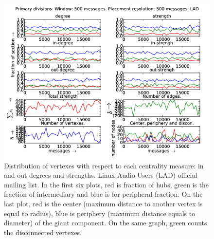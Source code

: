 \documentclass[%
 aip,
 jmp,%
 amsmath,amssymb,
 reprint,%
]{revtex4-1}
\begin{document}
\begin{figure}[hbtp] 
   \centering
        \includegraphics[width=\textwidth]{figs/LAD/500}
    \caption{Distribution of vertexes with respect to each centrality measure: in and out degrees and strengths. Linux Audio Users (LAD) official mailing list. In the first six plots, red is fraction of hubs, green is the fraction of intermediary and blue is for peripheral fraction. On the last plot, red is the center (maximum distance to another vertex is equal to radius), blue is periphery (maximum distance equals to diameter) of the giant component. On the same graph, green counts the disconnected vertexes.}
    \label{fig:lad500}
\end{figure}
\end{document}
